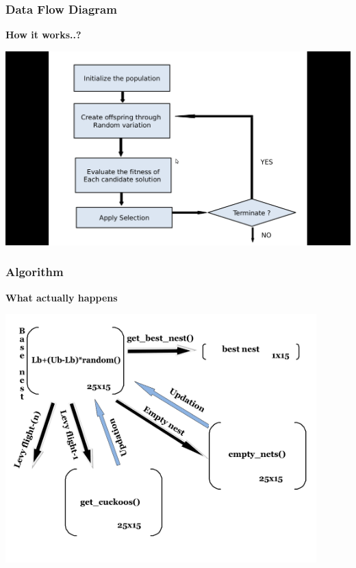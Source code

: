 \documentclass[10pt]{beamer}
\begin{document}
	
\begin{frame}
	\frametitle{Data Flow Diagram}
	\textbf{How it works..?}
	\begin{center}
	\includegraphics[width=1.0\textwidth]{aa.png}
	\end{center}
\end{frame}

\begin{frame}
	\frametitle{Algorithm}
	\textbf{What actually happens}
	\begin{center}
	\includegraphics[width=0.90\textwidth]{ae.png}
	\end{center}
\end{frame}
	
\end{document}
